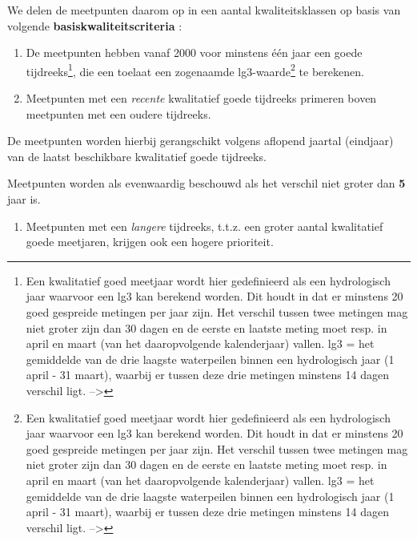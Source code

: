 \documentclass[11pt,]{book}
\providecommand{\tightlist}{%
  \setlength{\itemsep}{0pt}\setlength{\parskip}{0pt}}
\let\rmarkdownfootnote\footnote%
\def\footnote{\protect\rmarkdownfootnote}
\begin{document}
We delen de meetpunten daarom op in een aantal kwaliteitsklassen op
basis van volgende
\textbf{\protect\hypertarget{basiskwaliteitscriteria}{}{basiskwaliteitscriteria}}
:

\begin{enumerate}
\def\labelenumi{(\arabic{enumi})}
\item
  De meetpunten hebben vanaf 2000 voor minstens één jaar een goede
  tijdreeks\footnote{Een kwalitatief goed meetjaar wordt hier
    gedefinieerd als een hydrologisch jaar waarvoor een lg3 kan berekend
    worden. Dit houdt in dat er minstens 20 goed gespreide metingen per
    jaar zijn. Het verschil tussen twee metingen mag niet groter zijn
    dan 30 dagen en de eerste en laatste meting moet resp. in april en
    maart (van het daaropvolgende kalenderjaar) vallen. lg3 = het
    gemiddelde van de drie laagste waterpeilen binnen een hydrologisch
    jaar (1 april - 31 maart), waarbij er tussen deze drie metingen
    minstens 14 dagen verschil ligt. --\textgreater{}}, die een toelaat
  een zogenaamde lg3-waarde\footnote{Een kwalitatief goed meetjaar wordt
    hier gedefinieerd als een hydrologisch jaar waarvoor een lg3 kan
    berekend worden. Dit houdt in dat er minstens 20 goed gespreide
    metingen per jaar zijn. Het verschil tussen twee metingen mag niet
    groter zijn dan 30 dagen en de eerste en laatste meting moet resp.
    in april en maart (van het daaropvolgende kalenderjaar) vallen. lg3
    = het gemiddelde van de drie laagste waterpeilen binnen een
    hydrologisch jaar (1 april - 31 maart), waarbij er tussen deze drie
    metingen minstens 14 dagen verschil ligt. --\textgreater{}} te
  berekenen.
\item
  Meetpunten met een \emph{recente} kwalitatief goede tijdreeks primeren
  boven meetpunten met een oudere tijdreeks.
\end{enumerate}

De meetpunten worden hierbij gerangschikt volgens aflopend jaartal
(eindjaar) van de laatst beschikbare kwalitatief goede tijdreeks.

Meetpunten worden als evenwaardig beschouwd als het verschil niet groter
dan \textbf{5} jaar is.

\begin{enumerate}
\def\labelenumi{(\arabic{enumi})}
\setcounter{enumi}{2}
\tightlist
\item
  Meetpunten met een \emph{langere} tijdreeks, t.t.z. een groter aantal
  kwalitatief goede meetjaren, krijgen ook een hogere prioriteit.
\end{enumerate}
\end{document}
